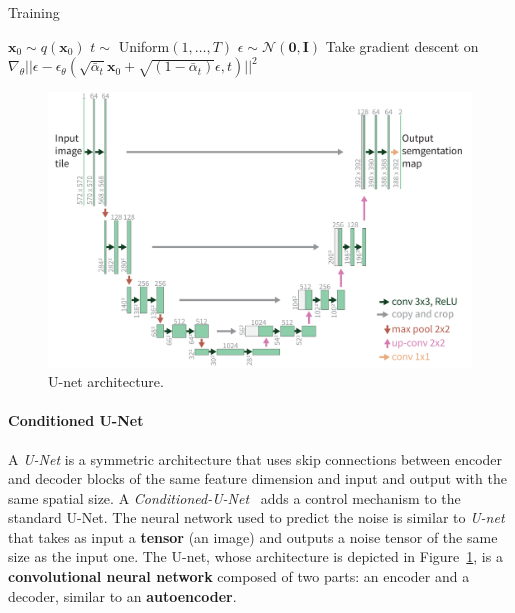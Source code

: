 \documentclass[sn-mathphys,Numbered]{sn-jnl}
\theoremstyle{thmstyleone}%
\theoremstyle{thmstyletwo}%
\theoremstyle{thmstylethree}%
\begin{document}
\begin{algorithm}[t]
    \caption{Training}\label{alg:training}
    \begin{algorithmic}[1]
    \Repeat
        \State $\mathbf{x}_0 \sim q(\mathbf{x}_0)$
        \State $t \sim$ Uniform$({1,\ldots,T})$
        \State $\epsilon \sim \mathcal{N}(\mathbf{0},\mathbf{I})$ 
        \State Take gradient descent on 
        $\nabla_\theta||\epsilon - \epsilon_\theta
	(\sqrt{\bar{\alpha}_t}\mathbf{x}_0 + \sqrt{(1-\bar{\alpha}_t)}\epsilon,t) ||^2$
    \end{algorithmic}
\end{algorithm}




\begin{figure}[t]
	\centering
    \includegraphics[scale=0.87]{img/svg/UNET.png}
	\caption{U-net architecture.}\label{fig:unet}
\end{figure}



\paragraph{Conditioned U-Net} A \emph{U-Net} is a symmetric architecture that uses skip connections between encoder and decoder blocks of the same feature dimension and input and output with the same spatial size. A \emph{Conditioned-U-Net}~\cite{conditionedunet} adds a control mechanism to the standard U-Net.
The neural network used to predict the noise is similar to \emph{U-net}~\cite{ronneberger2015unet} that takes as input a  \textbf{tensor} (an image) and outputs a noise tensor of the same size as the input one. The U-net, whose architecture is depicted in Figure~\ref{fig:unet}, is a \textbf{convolutional neural network}  composed of two parts: an encoder and a decoder, similar to an \textbf{autoencoder}.
\end{document}
